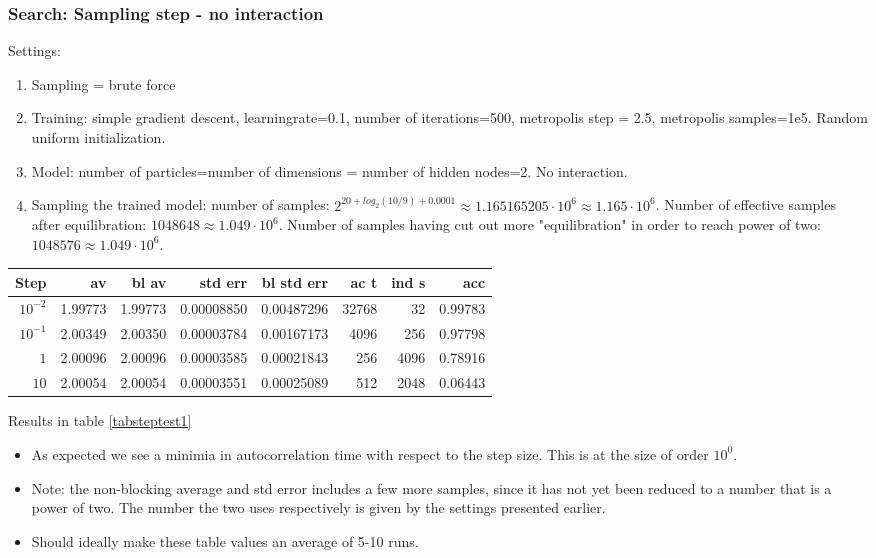 \documentclass[twoside,english]{uiofysmaster}
\newcommand{\ra}[1]{\renewcommand{\arraystretch}{#1}}
\begin{document}
\subsubsection{Search: Sampling step - no interaction}
Settings:
\begin{enumerate}
	\item Sampling = brute force
	\item Training: simple gradient descent, learningrate=0.1, number of iterations=500, metropolis step = 2.5, metropolis samples=1e5. Random uniform initialization.
	\item Model: number of particles=number of dimensions = number of hidden nodes=2. No interaction.
	\item Sampling the trained model: number of samples: $2^{20 + log_2 (10/9) + 0.0001} \approx 1.165165205\cdot 10^6 \approx 1.165 \cdot 10^6$. Number of effective samples after equilibration: $1048648\approx 1.049 \cdot 10^6$. Number of samples having cut out more "equilibration" in order to reach power of two: $1048576 \approx 1.049 \cdot 10^6$.
\end{enumerate}

\begin{table*}\centering
\ra{1.3}
\caption{Caption}
\label{tabsteptest1}
\begin{tabular}{rrrrrrrr}
\toprule
Step & av & bl av & std err & bl std err & ac t & ind s & acc \\ 
\midrule 
$10^{-2}$ & 1.99773 & 1.99773 & 0.00008850 & 0.00487296 & 32768 & 32   & 0.99783  \\
$10^{-1}$ & 2.00349 & 2.00350 & 0.00003784 & 0.00167173 & 4096  & 256  & 0.97798  \\
$1$       & 2.00096 & 2.00096 & 0.00003585 & 0.00021843 & 256   & 4096 & 0.78916  \\
$10$      & 2.00054 & 2.00054 & 0.00003551 & 0.00025089 & 512   & 2048 & 0.06443 \\
\bottomrule
\end{tabular}
\end{table*}

Results in table \ref{tabsteptest1}
\begin{itemize}
	\item As expected we see a minimia in autocorrelation time with respect to the step size. This is at the size of order $10^0$.
	\item Note: the non-blocking average and std error includes a few more samples, since it has not yet been reduced to a number that is a power of two. The number the two uses respectively is given by the settings presented earlier.
	\item Should ideally make these table values an average of 5-10 runs.
\end{itemize}
\end{document}
